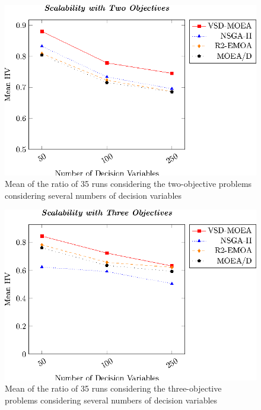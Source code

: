 \begin{figure}[t]
\centering
\includegraphics[scale=0.85]{Images/Graphic-Scalability-2obj_tikz-figure0.eps}
%
\caption{Mean of the \HV{} ratio of 35 runs considering the two-objective problems considering several numbers of decision variables}\label{fig:variable-decision-scalability-2obj}
\end{figure}

\begin{figure}[t]
\centering
\includegraphics[scale=0.85]{Images/Graphic-Scalability-3obj_tikz-figure0.eps}
%
\caption{Mean of the \HV{} ratio of 35 runs considering the three-objective problems considering several numbers of decision variables} \label{fig:variable-decision-scalability-3obj}
\end{figure}

